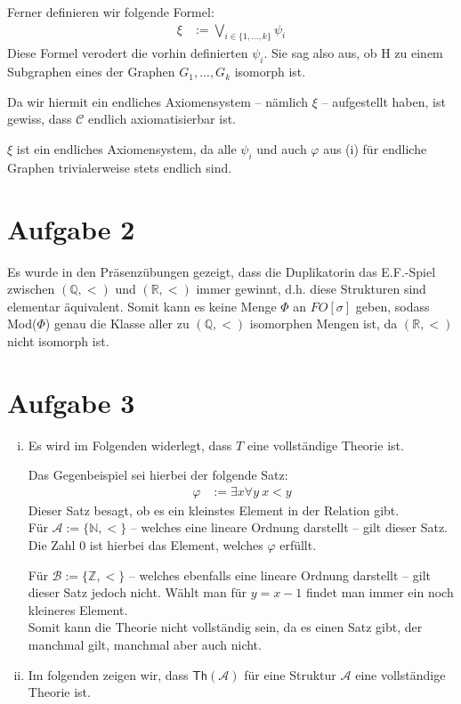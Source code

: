 \documentclass[a4paper,10pt]{article}
\begin{document}
\begin{enumerate}[(i)]
Ferner definieren wir folgende Formel:
\begin{align*}
\xi &:= \bigvee_{i \in \{1,...,k\}} \psi_i
\end{align*}
Diese Formel verodert die vorhin definierten $\psi_i$. Sie sag also aus, ob H zu einem Subgraphen eines der Graphen $G_1,...,G_k$ isomorph ist.

Da wir hiermit ein endliches Axiomensystem -- nämlich $\xi$ -- aufgestellt haben, ist gewiss, dass $\mathcal C$ endlich axiomatisierbar ist.

$\xi$ ist ein endliches Axiomensystem, da alle $\psi_i$ und auch $\varphi$ aus (i) für endliche Graphen trivialerweise stets endlich sind. 

\section*{Aufgabe 2}
Es wurde in den Präsenzübungen gezeigt, dass die Duplikatorin das E.F.-Spiel zwischen $(\mathbb{Q},<)$ und $(\mathbb{R},<)$ immer gewinnt, d.h. diese Strukturen sind elementar äquivalent.
Somit kann es keine Menge $\Phi$ an $FO[\sigma]$ geben, sodass Mod($\Phi$) genau die Klasse aller zu $(\mathbb{Q},<)$ isomorphen Mengen ist, da $(\mathbb{R},<)$ nicht isomorph ist.
\section*{Aufgabe 3}
\begin{enumerate}[(i)]
\item Es wird im Folgenden widerlegt, dass $T$ eine vollständige Theorie ist.

Das Gegenbeispiel sei hierbei der folgende Satz:
\begin{align*}
\varphi &:= \exists x \forall y~ x < y
\end{align*}
Dieser Satz besagt, ob es ein kleinstes Element in der Relation gibt. \\

Für $\mathcal A := \{\mathbb{N},<\}$ -- welches eine lineare Ordnung darstellt -- gilt dieser Satz. Die Zahl $0$ ist hierbei das Element, welches $\varphi$ erfüllt.

Für $\mathcal B := \{\mathbb{Z},<\}$ -- welches ebenfalls eine lineare Ordnung darstellt -- gilt dieser Satz jedoch nicht. Wählt man für $y = x-1$ findet man immer ein noch kleineres Element.\\

Somit kann die Theorie nicht vollständig sein, da es einen Satz gibt, der manchmal gilt, manchmal aber auch nicht. 
\item Im folgenden zeigen wir, dass $\textsf{Th}(\mathcal{A})$ für eine Struktur $\mathcal{A}$ eine vollständige Theorie ist.


\end{enumerate}
\end{enumerate}
\end{document}
